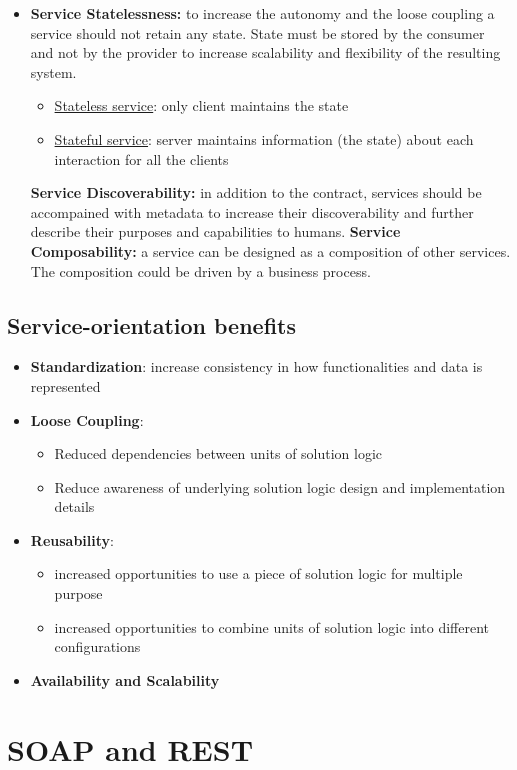 \documentclass[10pt,a4paper]{article}
\begin{document}
\begin{itemize}
\begin{itemize}
	\end{itemize}
	\item \textbf{Service Statelessness:} to increase the autonomy and the loose coupling a service should not retain any state. State must be stored by the consumer and not by the provider to increase scalability and flexibility of the resulting system.
	\begin{itemize}
		\item \uline{Stateless service}: only client maintains the state
		\item \uline{Stateful service}: server maintains information (the state) about each interaction for all the clients
	\end{itemize}
	\textbf{Service Discoverability:} in addition to the contract, services should be accompained with metadata to increase their discoverability and further describe their purposes and capabilities to humans.
	\textbf{Service Composability:} a service can be designed as a composition of other services. The composition could be driven by a business process.
\end{itemize}
\subsection{Service-orientation benefits}
\begin{itemize}
	\item \textbf{Standardization}: increase consistency in how functionalities and data is represented
	\item \textbf{Loose Coupling}:
	\begin{itemize}
		\item Reduced dependencies between units of solution logic
		\item Reduce awareness of underlying solution logic design and implementation details	
	\end{itemize} 
	\item \textbf{Reusability}: 
	\begin{itemize}
		\item increased opportunities to use a piece of solution logic for multiple purpose
		\item increased opportunities to combine units of solution logic into different configurations
	\end{itemize}
	\item \textbf{Availability and Scalability}
\end{itemize}
\pagebreak
\section{\LARGE SOAP and REST}
\end{document}
